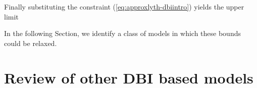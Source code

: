 % 
%  

Finally substituting the constraint (\ref{eq:approxlyth-dbiintro}) 
yields the upper limit \cite{lidseyhuston}
% 



In the following Section, we identify a class of models in which  
these bounds could be relaxed. 
% 
% 
% 
% 
\section{Review of other DBI based models} 


